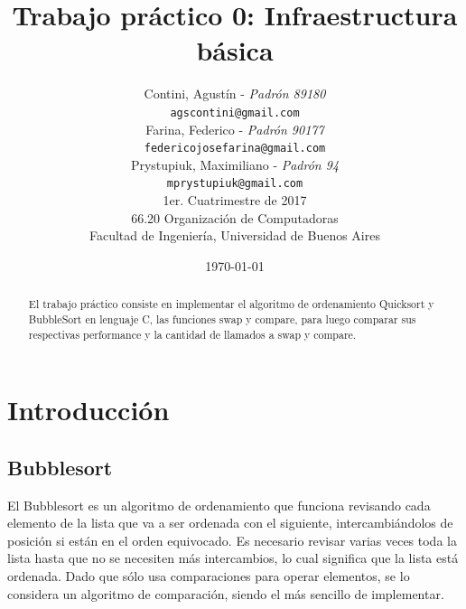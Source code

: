 \documentclass[a4paper,10pt]{article}
\title{ \textbf{Trabajo pr\'actico 0: Infraestructura b\'asica } }
\author{Contini, Agust\'in - \textit{Padr\'on 89180}			\\
            \texttt{ agscontini@gmail.com }				\\
            Farina, Federico - \textit{Padr\'on 90177}			\\
            \texttt{ federicojosefarina@gmail.com }				\\
            Prystupiuk, Maximiliano  - \textit{Padr\'on 94  }			\\
            \texttt{ mprystupiuk@gmail.com  }					\\[2.5ex]
            1er. Cuatrimestre de 2017					\\[1.0ex]
            \normalsize{66.20 Organizaci\'on de Computadoras}		\\
            \normalsize{Facultad de Ingenier\'ia, Universidad de Buenos Aires}	\\
	}
\date{\today}
\begin{document}

\maketitle
\bigskip
\thispagestyle{empty}	%

\begin{abstract}
El trabajo práctico consiste en implementar el algoritmo de ordenamiento Quicksort y BubbleSort en lenguaje C, las funciones swap y compare, para luego comparar sus respectivas performance y la cantidad de llamados a swap y compare.
\end{abstract}





\pagestyle{fancy}





\normalsize

\newpage
\tableofcontents	%

\vspace{2.0cm}
\listoffigures		%



\newpage
\section{Introducci\'on}

\subsection{Bubblesort}
El Bubblesort es un algoritmo de ordenamiento que funciona revisando cada elemento de la lista que va a ser ordenada con el siguiente, intercambi\'andolos de posici\'on si est\'an en el orden equivocado. Es necesario revisar varias veces toda la lista hasta que no se necesiten m\'as intercambios, lo cual significa que la lista est\'a ordenada. Dado que s\'olo usa comparaciones para operar elementos, se lo considera un algoritmo de comparaci\'on, siendo el m\'as sencillo de implementar.
\end{document}
